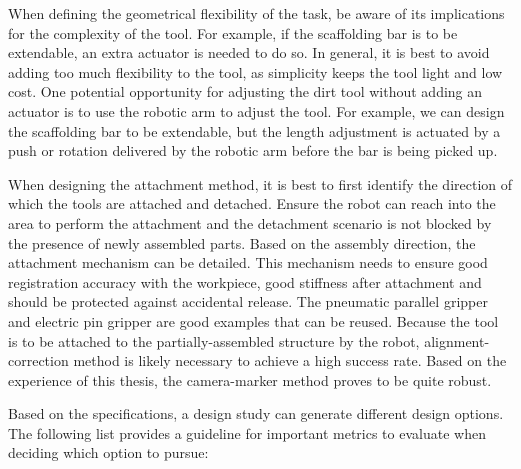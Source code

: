 \documentclass[11pt]{book}
\begin{document}
When defining the geometrical flexibility of the task, be aware of its implications for the complexity of the tool. For example, if the scaffolding bar is to be extendable, an extra actuator is needed to do so. In general, it is best to avoid adding too much flexibility to the tool, as simplicity keeps the tool light and low cost. One potential opportunity for adjusting the dirt tool without adding an actuator is to use the robotic arm to adjust the tool. For example, we can design the scaffolding bar to be extendable, but the length adjustment is actuated by a push or rotation delivered by the robotic arm before the bar is being picked up.

When designing the attachment method, it is best to first identify the direction of which the tools are attached and detached. Ensure the robot can reach into the area to perform the attachment and the detachment scenario is not blocked by the presence of newly assembled parts. Based on the assembly direction, the attachment mechanism can be detailed. This mechanism needs to ensure good registration accuracy with the workpiece, good stiffness after attachment and should be protected against accidental release. The pneumatic parallel gripper and electric pin gripper are good examples that can be reused. Because the tool is to be attached to the partially-assembled structure by the robot, alignment-correction method is likely necessary to achieve a high success rate. Based on the experience of this thesis, the camera-marker method proves to be quite robust. 

Based on the specifications, a design study can generate different design options. The following list provides a guideline for important metrics to evaluate when deciding which option to pursue:
\end{document}
